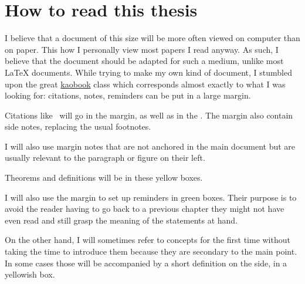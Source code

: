 \chapter{How to read this thesis}

I believe that a document of this size will be more often viewed on computer
than on paper. This how I personally view most papers I read anyway.
As such, I believe that the document should be adapted for such a medium, unlike
most \LaTeX{} documents.
While trying to make my own kind of document, I stumbled upon the great
\href{https://github.com/fmarotta/kaobook/}{kaobook} class which corresponds
almost exactly to what I was looking for: citations, notes, reminders can be put
in a large margin.

Citations like~ will go in the
margin, as well as in the .
The margin also contain side notes, replacing the usual footnotes.

I will also use margin notes that are not anchored in the main document but are
usually relevant to the paragraph or figure on their left.

\begin{theorem}
  Theorems and definitions will be in these yellow boxes.
\end{theorem}

I will also use the margin to set up reminders in green boxes. Their purpose
is to avoid the reader having to go back to a previous chapter they might not
have even read and still grasp the meaning of the statements at hand.

On the other hand, I will sometimes refer to concepts for the first time without
taking the time to introduce them because they are secondary to the main point.
In some cases those will be accompanied by a short definition on the side, in
a yellowish box.